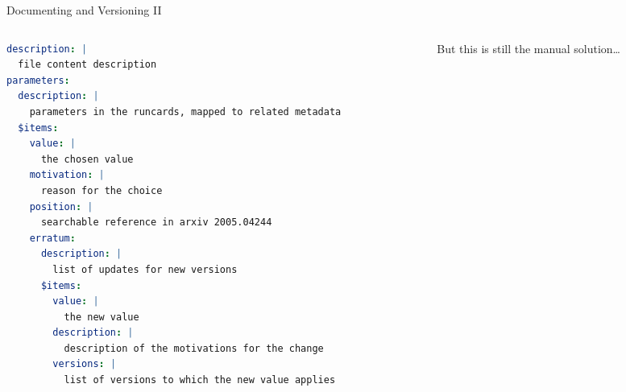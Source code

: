 \documentclass[9pt]{beamer}
\begin{document}
\begin{frame}[fragile]{Documenting and Versioning II}
    \begin{columns}
        \begin{column}{0.5\textwidth}
            \begin{lstlisting}[language=yaml, style=mystyle, breaklines=true]
description: |
  file content description
parameters:
  description: |
    parameters in the runcards, mapped to related metadata
  $items:
    value: |
      the chosen value
    motivation: |
      reason for the choice
    position: |
      searchable reference in arxiv 2005.04244
    erratum:
      description: |
        list of updates for new versions
      $items:
        value: |
          the new value
        description: |
          description of the motivations for the change
        versions: |
          list of versions to which the new value applies
\end{lstlisting}
        \end{column}
        \begin{column}{0.5\textwidth}
            But this is still the manual solution\dots
        \end{column}
    \end{columns}
\end{frame}
\end{document}
